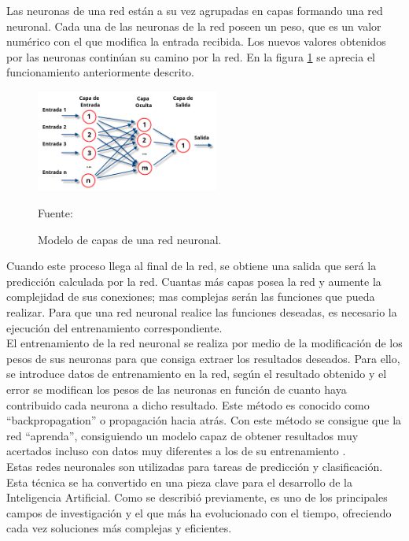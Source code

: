 Las neuronas de una red están a su vez agrupadas en capas formando una red neuronal. Cada una de las neuronas de la red poseen un peso, que es un valor numérico con el que modifica la entrada recibida. Los nuevos valores obtenidos por las neuronas continúan su camino por la red. En la figura \ref{fig:estructura_red_neuronal} se aprecia el funcionamiento anteriormente descrito.\\

\begin{figure}[H]
    \begin{center}
        \includegraphics[width=6cm]{img/capitulo_2/Redes_neuronales_esquema.png}
        \caption{Modelo de capas de una red neuronal.\\}
        Fuente: \cite{perceptron_multicapa}
        \label{fig:estructura_red_neuronal}
    \end{center}
\end{figure}

Cuando este proceso llega al final de la red, se obtiene una salida que será la predicción calculada por la red. Cuantas más capas posea la red y aumente la complejidad de sus conexiones; mas complejas serán las funciones que pueda realizar. Para que una red neuronal realice las funciones deseadas, es necesario la ejecución del entrenamiento correspondiente.\\

El entrenamiento de la red neuronal se realiza por medio de la modificación de los pesos de sus neuronas para que consiga extraer los resultados deseados. Para ello, se introduce datos de entrenamiento en la red, según el resultado obtenido y el error se modifican los pesos de las neuronas en función de cuanto haya contribuido cada neurona a dicho resultado. Este método es conocido como ``backpropagation'' o propagación hacia atrás. Con este método se consigue que la red ``aprenda'', consiguiendo un modelo capaz de obtener resultados muy acertados incluso con datos muy diferentes a los de su entrenamiento \cite{atriainnovation:ia}.\\

Estas redes neuronales son utilizadas para tareas de predicción y clasificación. Esta técnica se ha convertido en una pieza clave para el desarrollo de la Inteligencia Artificial. Como se describió previamente, es uno de los principales campos de investigación y el que más ha evolucionado con el tiempo, ofreciendo cada vez soluciones más complejas y eficientes.\\

